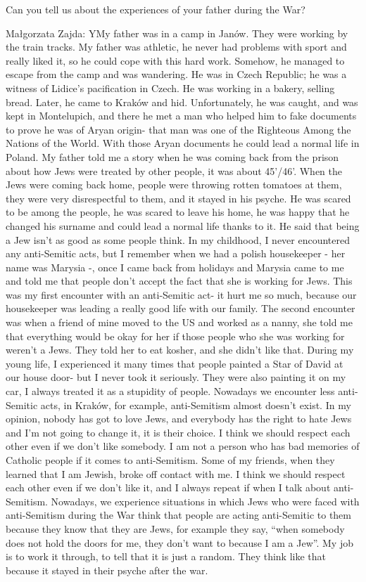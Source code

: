 Can you tell us about the experiences of your father during the War? 

Małgorzata Zajda: YMy father was in a camp in Janów. They were working by the train tracks. My father was athletic, he never had problems with sport and really liked it, so he could cope with this hard work. Somehow, he managed to escape from the camp and was wandering. He was in Czech Republic; he was a witness of Lidice's pacification in Czech. He was working in a bakery, selling bread. Later, he came to Kraków and hid. Unfortunately, he was caught, and was kept in Montelupich, and there he met a man who helped him to fake documents to prove he was of Aryan origin- that man was one of the Righteous Among the Nations of the World. With those Aryan documents he could lead a normal life in Poland. 
My father told me a story when he was coming back from the prison about how Jews were treated by other people, it was about 45'/46'. When the Jews were coming back home, people were throwing rotten tomatoes at them, they were very disrespectful to them, and it stayed in his psyche. He was scared to be among the people, he was scared to leave his home, he was happy that he changed his surname and could lead a normal life thanks to it. He said that being a Jew isn't as good as some people think. In my childhood, I never encountered any anti-Semitic acts, but I remember when we had a polish housekeeper - her name was Marysia -, once I came back from holidays and Marysia came to me and told me that people don't accept the fact that she is working for Jews. This was my first encounter with an anti-Semitic act- it hurt me so much, because our housekeeper was leading a really good life with our family. The second encounter was when a friend of mine moved to the US and worked as a nanny, she told me that everything would be okay for her if those people who she was working for weren't a Jews. They told her to eat kosher, and she didn't like that. During my young life, I experienced it many times that people painted a Star of David at our house door- but I never took it seriously. They were also painting it on my car, I always treated it as a stupidity of people. Nowadays we encounter less anti-Semitic acts, in Kraków, for example, anti-Semitism almost doesn't exist. In my opinion, nobody has got to love Jews, and everybody has the right to hate Jews and I’m not going to change it, it is their choice. I think we should respect each other even if we don't like somebody. I am not a person who has bad memories of Catholic people if it comes to anti-Semitism. Some of my friends, when they learned that I am Jewish, broke off contact with me. I think we should respect each other even if we don't like it, and I always repeat if when I talk about anti-Semitism. Nowadays, we experience situations in which Jews who were faced with anti-Semitism during the War think that people are acting anti-Semitic to them because they know that they are Jews, for example they say, “when somebody does not hold the doors for me, they don't want to because I am a Jew”. My job is to work it through, to tell that it is just a random. They think like that because it stayed in their psyche after the war.  

